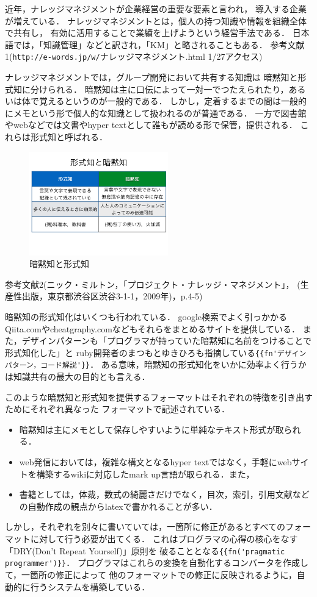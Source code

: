 近年，ナレッジマネジメントが企業経営の重要な要素と言われ，
導入する企業が増えている．
ナレッジマネジメントとは，個人の持つ知識や情報を組織全体で共有し，
有効に活用することで業績を上げようという経営手法である．
日本語では，「知識管理」などと訳され，「KM」と略されることもある．
参考文献1(\verb|http://e-words.jp/w/|ナレッジマネジメント.html 1/27アクセス)

ナレッジマネジメントでは，グループ開発において共有する知識は
暗黙知と形式知に分けられる．
暗黙知は主に口伝によって一対一でつたえられたり，あるいは体で覚えるというのが一般的である．
しかし，定着するまでの間は一般的にメモという形で個人的な知識として扱われるのが普通である．
一方で図書館やwebなどでは文書やhyper textとして誰もが読める形で保管，提供される．
これらは形式知と呼ばれる．

\begin{figure}[htbp]\begin{center}
\includegraphics[width=6cm,bb=0 0 442 500]{../figs/./my_help2hiki_saki.001.png}
\caption{暗黙知と形式知}
\label{default}\end{center}\end{figure}
参考文献2(ニック・ミルトン，「プロジェクト・ナレッジ・マネジメント」，
(生産性出版，東京都渋谷区渋谷3-1-1，2009年)，p.4-5)

暗黙知の形式知化はいくつも行われている．
google検索でよく引っかかるQiita.comやcheatgraphy.comなどもそれらをまとめるサイトを提供している．
また，デザインパターンも「プログラマが持っていた暗黙知に名前をつけることで形式知化した」と
ruby開発者のまつもとゆきひろも指摘している\verb|{{fn'デザインパターン，コード解説'}}|．
ある意味，暗黙知の形式知化をいかに効率よく行うかは知識共有の最大の目的とも言える．

このような暗黙知と形式知を提供するフォーマットはそれぞれの特徴を引き出すためにそれぞれ異なった
フォーマットで記述されている．

\begin{itemize}
\item 暗黙知は主にメモとして保存しやすいように単純なテキスト形式が取られる．
\item web発信においては，複雑な構文となるhyper textではなく，手軽にwebサイトを構築するwikiに対応したmark up言語が取られる．また，
\item 書籍としては，体裁，数式の綺麗さだけでなく，目次，索引，引用文献などの自動作成の観点からlatexで書かれることが多い．
\end{itemize}
しかし，それぞれを別々に書いていては，一箇所に修正があるとすべてのフォーマットに対して行う必要が出てくる．
これはプログラマの心得の核心をなす「DRY(Don't Repeat Yourself)」原則を
破ることとなる\verb|{{fn('pragmatic programmer')}}|．
プログラマはこれらの変換を自動化するコンバータを作成して，一箇所の修正によって
他のフォーマットでの修正に反映されるように，自動的に行うシステムを構築している．

